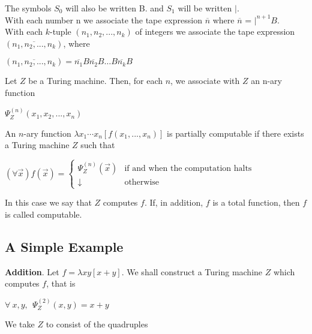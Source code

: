 The symbols $S_0$ will also be written B. and $S_1$ will be written $|$.\\
With each number n we associate the tape expression $\overline{n}$ where $\overline{n}$ = $|^{n+1} B$.\\
With each $k$-tuple $(n_1,n_2,...,n_k)$ of integers we associate the tape expression $(\overline{n_1,n_2,...,n_k})$, where 
\begin{center}
	$(\overline{n_1,n_2,...,n_k}) = \overline{n_1}B\overline{n_2}B\ldots B\overline{n_k} B$
\end{center}
Let $Z$ be a Turing machine. Then, for each $n$, we associate with $Z$ an n-ary function
\begin{center}
	$
	\Psi_Z^{(n)}(x_1, x_2,...,x_n)
	$
\end{center}
An $n$-ary function $\lambda x_1\cdots x_n [f(x_1,...,x_n)]$ is partially computable if there exists a Turing machine $Z$ such that
\begin{center}
	$(\forall \overrightarrow x) f(\overrightarrow x) = 
	\begin{cases}
		\Psi_Z^{(n)}(\overrightarrow x)	&	\mbox{if and when the computation halts} \\
		\downarrow								&	\mbox{otherwise}
	\end{cases}
	$
\end{center}
In this case we say that $Z$ computes $f$. If, in addition, $f$ is a total function, then $f$ is called computable.



\subsection{A Simple Example}
\textbf{Addition}. Let $f = \lambda xy[x+y]$. We shall construct a Turing machine $Z$ which computes $f$, that is 
\begin{center}
	$
	\forall \ x,y, \ \ 
	\Psi_Z^{(2)}(x,y) = x+y
	$
\end{center}
We take $Z$ to consist of the quadruples

